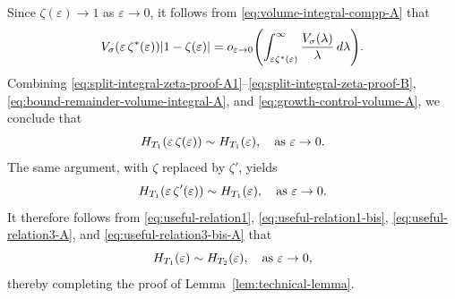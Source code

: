 \documentclass[a4paper,12pt]{article}
\let\originalleft\left
\let\originalright\right
\renewcommand{\left}{\mathopen{}\mathclose\bgroup\originalleft}
\renewcommand{\right}{\aftergroup\egroup\originalright}
\newcommand{\diff}{\mathop{}\!d}
\newcommand{\symbolnot}{\sigma}
\begin{document}
Since $\zeta(\varepsilon) \to 1$ as $\varepsilon\to 0$, it follows from \eqref{eq:volume-integral-compp-A} that 
\begin{equation}\label{eq:growth-control-volume-A}
    V_{\symbolnot}(\varepsilon \, \zeta^*(\varepsilon))|1 - \zeta(\varepsilon)|
    = o_{\varepsilon \to 0}\left(\int_{\varepsilon\zeta^*(\varepsilon)}^\infty 
    \frac{V_{\symbolnot}(\lambda)}{\lambda} \diff \lambda\right).
\end{equation}
Combining \eqref{eq:split-integral-zeta-proof-A1}--\eqref{eq:split-integral-zeta-proof-B}, \eqref{eq:bound-remainder-volume-integral-A}, and \eqref{eq:growth-control-volume-A}, 
we conclude that 
\begin{equation}\label{eq:useful-relation3-A}
    H_{T_1}\left(\varepsilon \, \zeta(\varepsilon)\right) 
    \sim H_{T_1}\left(\varepsilon\right),
    \quad \text{as }\varepsilon \to 0.
\end{equation}
The same argument, with $\zeta$ replaced by $\zeta'$,
yields
\begin{equation}\label{eq:useful-relation3-bis-A}
    H_{T_1}\left(\varepsilon \, \zeta'(\varepsilon)\right) 
    \sim H_{T_1}\left(\varepsilon\right),
    \quad \text{as }\varepsilon \to 0.
\end{equation}
It therefore follows  from \eqref{eq:useful-relation1}, \eqref{eq:useful-relation1-bis}, \eqref{eq:useful-relation3-A}, and \eqref{eq:useful-relation3-bis-A} that
\begin{equation*}%
    H_{T_1}(\varepsilon)
    \sim H_{T_2}\left(\varepsilon \right),
    \quad\text{as } \varepsilon\to 0,
\end{equation*}
thereby completing the proof of Lemma~\ref{lem:technical-lemma}.
\fi 
\end{document}
